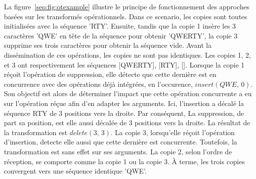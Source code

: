 La figure~\ref{seq:fig:otexample} illustre le principe de fonctionnement des
approches basées sur les transformés opérationnels. Dans ce scenario, les copies
sont toutes initialisées avec la séquence 'RTY'. Ensuite, tandis que la copie 1
insère les 3 caractères 'QWE' en tête de la séquence pour obtenir 'QWERTY', la
copie 3 supprime ses trois caractères pour obtenir la séquence vide. Avant la
dissémination de ces opérations, les copies ne sont pas identiques. Les copies
1, 2, et 3 ont respectivement les séquences [QWERTY], [RTY], []. Lorsque la
copie 1 réçoit l'opération de suppression, elle détecte que cette dernière est
en concurrence avec des opérations déjà intégrées, en l'occurence,
$insert(QWE,\,0)$. Son objectif est alors de déterminer l'impact que cette
opération concurrente a eu sur l'opération réçue afin d'en adapter les
arguments. Ici, l'insertion a décalé la séquence RTY de 3 positions vers la
droite. Par conséquent, La suppression, de part sa position, est elle aussi
décalée de 3 positions vers la droite. La résultat de la transformation est
$delete(3,\,3)$.  La copie 3, lorsqu'elle réçoit l'opération d'insertion,
detecte elle aussi que cette dernière est concurrente. Toutefois, la
transformation est sans effet sur ses arguments. La copie 2, selon l'ordre de
réception, se comporte comme la copie 1 ou la copie 3. À terme, les trois copies
convergent vers une séquence identique 'QWE'.
